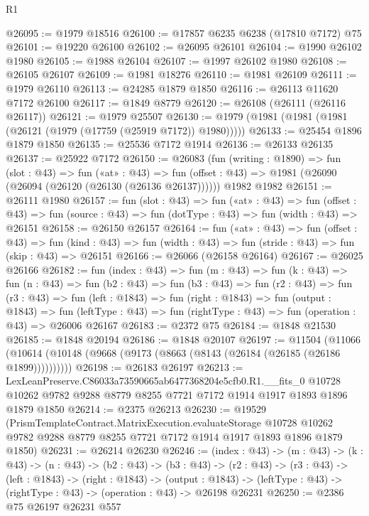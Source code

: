 \begin{lexlean}{R1}
\begin{coremodule}
@26095 := @1979 @18516
@26100 := @17857 @6235 @6238 (@17810 @7172) @75
@26101 := @19220 @26100
@26102 := @26095 @26101
@26104 := @1990 @26102 @1980
@26105 := @1988 @26104
@26107 := @1997 @26102 @1980
@26108 := @26105 @26107
@26109 := @1981 @18276
@26110 := @1981 @26109
@26111 := @1979 @26110
@26113 := @24285 @1879 @1850
@26116 := @26113 @11620 @7172 @26100
@26117 := @1849 @8779
@26120 := @26108 (@26111 (@26116 @26117))
@26121 := @1979 @25507
@26130 := @1979 (@1981 (@1981 (@1981 (@26121 (@1979 (@17759 (@25919 @7172)) @1980)))))
@26133 := @25454 @1896 @1879 @1850
@26135 := @25536 @7172 @1914
@26136 := @26133 @26135
@26137 := @25922 @7172
@26150 := @26083
    (fun (writing : @1890) =>
    fun (slot : @43) =>
    fun («at» : @43) =>
    fun (offset : @43) => @1981 (@26090 (@26094 (@26120 (@26130 (@26136 @26137))))))
    @1982
    @1982
@26151 := @26111 @1980
@26157 := fun (slot : @43) =>
  fun («at» : @43) =>
  fun (offset : @43) => fun (source : @43) => fun (dotType : @43) => fun (width : @43) => @26151
@26158 := @26150 @26157
@26164 := fun («at» : @43) =>
  fun (offset : @43) =>
  fun (kind : @43) => fun (width : @43) => fun (stride : @43) => fun (skip : @43) => @26151
@26166 := @26066 (@26158 @26164)
@26167 := @26025 @26166
@26182 := fun (index : @43) =>
  fun (m : @43) =>
  fun (k : @43) =>
  fun (n : @43) =>
  fun (b2 : @43) =>
  fun (b3 : @43) =>
  fun (r2 : @43) =>
  fun (r3 : @43) =>
  fun (left : @1843) =>
  fun (right : @1843) =>
  fun (output : @1843) =>
  fun (leftType : @43) => fun (rightType : @43) => fun (operation : @43) => @26006 @26167
@26183 := @2372 @75
@26184 := @1848 @21530
@26185 := @1848 @20194
@26186 := @1848 @20107
@26197 := @11504
    (@11066 (@10614 (@10148 (@9668 (@9173 (@8663 (@8143 (@26184 (@26185 (@26186 @1899))))))))))
@26198 := @26183 @26197
@26213 := LexLeanPreserve.C86033a73590665ab6477368204e5cfb0.R1.__fits_0
    @10728
    @10262
    @9782
    @9288
    @8779
    @8255
    @7721
    @7172
    @1914
    @1917
    @1893
    @1896
    @1879
    @1850
@26214 := @2375 @26213
@26230 := @19529
    (PrismTemplateContract.MatrixExecution.evaluateStorage
      @10728
      @10262
      @9782
      @9288
      @8779
      @8255
      @7721
      @7172
      @1914
      @1917
      @1893
      @1896
      @1879
      @1850)
@26231 := @26214 @26230
@26246 := (index : @43) ->
  (m : @43) ->
  (k : @43) ->
  (n : @43) ->
  (b2 : @43) ->
  (b3 : @43) ->
  (r2 : @43) ->
  (r3 : @43) ->
  (left : @1843) ->
  (right : @1843) ->
  (output : @1843) -> (leftType : @43) -> (rightType : @43) -> (operation : @43) -> @26198 @26231
@26250 := @2386 @75 @26197 @26231 @557

\end{coremodule}
\end{lexlean}
